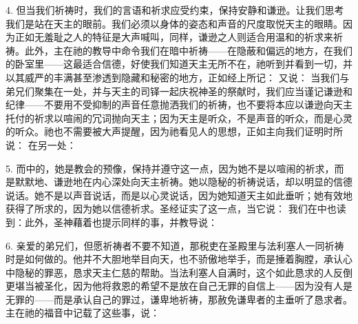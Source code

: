 4. 但当我们祈祷时，我们的言语和祈求应受约束，保持安静和谦逊。让我们思考我们是站在天主的眼前。我们必须以身体的姿态和声音的尺度取悦天主的眼睛。因为正如无羞耻之人的特征是大声喊叫，同样，谦逊之人则适合用温和的祈求来祈祷。此外，主在祂的教导中命令我们在暗中祈祷——在隐蔽和偏远的地方，在我们的卧室里——这最适合信德，好使我们知道天主无所不在，祂听到并看到一切，并以其威严的丰满甚至渗透到隐藏和秘密的地方，正如经上所记： 又说： 当我们与弟兄们聚集在一处，并与天主的司铎一起庆祝神圣的祭献时，我们应当谨记谦逊和纪律——不要用不受抑制的声音任意抛洒我们的祈祷，也不要将本应以谦逊向天主托付的祈求以喧闹的冗词抛向天主；因为天主是听众，不是声音的听众，而是心灵的听众。祂也不需要被大声提醒，因为祂看见人的思想，正如主向我们证明时所说： 在另一处： \par

5. 而中的，她是教会的预像，保持并遵守这一点，因为她不是以喧闹的祈求，而是默默地、谦逊地在内心深处向天主祈祷。她以隐秘的祈祷说话，却以明显的信德说话。她不是以声音说话，而是以心灵说话，因为她知道天主如此垂听；她有效地获得了所求的，因为她以信德祈求。圣经证实了这一点，当它说： 我们在中也读到：此外，圣神藉着也提示同样的事，并教导说：\par

6. 亲爱的弟兄们，但愿祈祷者不要不知道，那税吏在圣殿里与法利塞人一同祈祷时是如何做的。他并不大胆地举目向天，也不骄傲地举手，而是捶着胸膛，承认心中隐秘的罪恶，恳求天主仁慈的帮助。当法利塞人自满时，这个如此恳求的人反倒更堪当被圣化，因为他将救恩的希望不是放在自己无罪的自信上——因为没有人是无罪的——而是承认自己的罪过，谦卑地祈祷，那赦免谦卑者的主垂听了恳求者。主在祂的福音中记载了这些事，说：\newline{}\par

